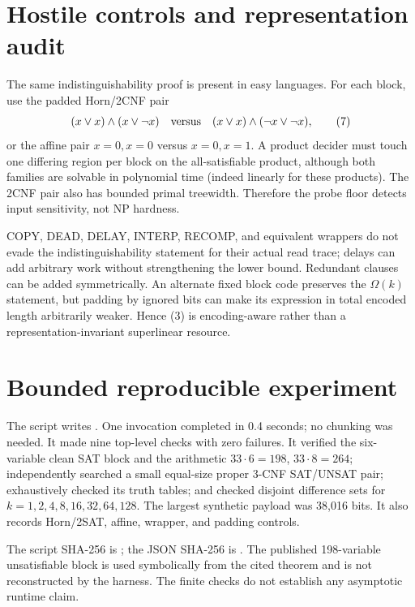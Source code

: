 \documentclass[11pt]{article}
\begin{document}
\section{Hostile controls and representation audit}
The same indistinguishability proof is present in easy languages.  For each
block, use the padded Horn/2CNF pair
\[
 (x\vee x)\wedge(x\vee\neg x)
 \quad\hbox{versus}\quad
 (x\vee x)\wedge(\neg x\vee\neg x),                      \tag{7}
\]
or the affine pair \(x=0,x=0\) versus \(x=0,x=1\).  A product decider must
touch one differing region per block on the all-satisfiable product, although
both families are solvable in polynomial time (indeed linearly for these
products).  The 2CNF pair also has bounded primal treewidth.  Therefore the
probe floor detects input sensitivity, not NP hardness.

COPY, DEAD, DELAY, INTERP, RECOMP, and equivalent wrappers do not evade the
indistinguishability statement for their actual read trace; delays can add
arbitrary work without strengthening the lower bound.  Redundant clauses can
be added symmetrically.  An alternate fixed block code preserves the
\(\Omega(k)\) statement, but padding by ignored bits can make its expression in
total encoded length arbitrarily weaker.  Hence (3) is encoding-aware rather
than a representation-invariant superlinear resource.

\section{Bounded reproducible experiment}
The script
 writes
.  One
invocation completed in 0.4 seconds; no chunking was needed.  It made nine
top-level checks with zero failures.  It verified the six-variable clean SAT
block and the arithmetic \(33\cdot6=198\), \(33\cdot8=264\); independently
searched a small equal-size proper 3-CNF SAT/UNSAT pair; exhaustively checked
its truth tables; and checked disjoint difference sets for
\(k=1,2,4,8,16,32,64,128\).  The largest synthetic payload was 38,016 bits.
It also records Horn/2SAT, affine, wrapper, and padding controls.

The script SHA-256 is
;
the JSON SHA-256 is
.
The published 198-variable unsatisfiable block is used symbolically from the
cited theorem and is not reconstructed by the harness.  The finite checks do
not establish any asymptotic runtime claim.
\end{document}
